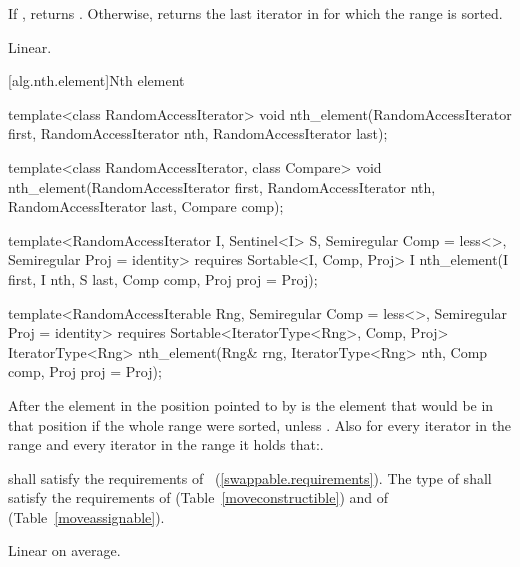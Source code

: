 \begin{itemdescr}
\pnum
\returns If , returns
. Otherwise, returns
the last iterator  in  for which the
range  is sorted.

\pnum
\complexity Linear.
\end{itemdescr}

[alg.nth.element]{Nth element}

%
\begin{removedblock}
\begin{itemdecl}
template<class RandomAccessIterator>
  void nth_element(RandomAccessIterator first, RandomAccessIterator nth,
                   RandomAccessIterator last);

template<class RandomAccessIterator, class Compare>
  void nth_element(RandomAccessIterator first, RandomAccessIterator nth,
                   RandomAccessIterator last,  Compare comp);
\end{itemdecl}
\end{removedblock}
\begin{addedblock}
\begin{itemdecl}
template<RandomAccessIterator I, Sentinel<I> S, Semiregular Comp = less<>,
    Semiregular Proj = identity>
  requires Sortable<I, Comp, Proj>
  I nth_element(I first, I nth, S last, Comp comp, Proj proj = Proj{});

template<RandomAccessIterable Rng, Semiregular Comp = less<>, Semiregular Proj = identity>
  requires Sortable<IteratorType<Rng>, Comp, Proj>
  IteratorType<Rng>
    nth_element(Rng& rng, IteratorType<Rng> nth, Comp comp, Proj proj = Proj{});
\end{itemdecl}
\end{addedblock}

\begin{itemdescr}
\pnum
After
the element in the position pointed to by 
is the element that would be
in that position if the whole range were sorted, unless .
Also for every iterator
in the range
and every iterator
in the range
it holds that:.

\begin{removedblock}
\pnum
\requires
{} shall satisfy the requirements of
~(\ref{swappable.requirements}). The type
of  shall satisfy the requirements of
 (Table~\ref{moveconstructible}) and of
 (Table~\ref{moveassignable}).
\end{removedblock}

\pnum
\complexity
Linear on average.
\end{itemdescr}

